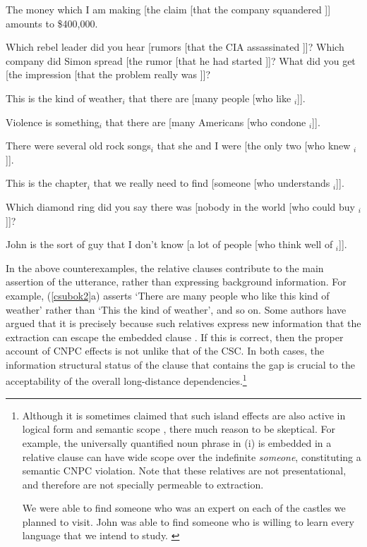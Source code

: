 \documentclass[output=paper
                ,modfonts
                ,nonflat
	        ,collection
	        ,collectionchapter
	        ,collectiontoclongg
 	        ,biblatex
                ,babelshorthands
                ,newtxmath
                ,draftmode
                ,colorlinks, citecolor=brown
]{./langsci/langscibook}
\begin{document}
\eal
 \label{csubok}
\ex The money which I am making [the claim [that the company squandered \spc]] amounts to \$400,000.\\
 \citep[206, 207]{pollardsag}

\ex  Which rebel leader did you hear [rumors [that the CIA assassinated \spc]]?
\ex Which company did Simon spread [the rumor [that he had started \spc]]?
\ex What did you get [the impression [that the problem really was \spc]]?\\
\citep{kluender}
\zl



\eal \label{csubok2}
\ex This is the kind of weather$_i$ that there are [many people [who like \spc$_i$]].\\
\citep{shirlappin}

\ex Violence is something$_i$ that there are [many Americans [who condone \spc$_i$]].\\
\citep[108]{mccawley81}

\ex There were several old rock songs$_i$ that she and I were [the only two [who
knew \spc$_i$]].\\
\citep{chungmc}

\ex This is the chapter$_i$ that we really need to find [someone [who understands \spc$_i$]].\\
\citep[238]{kluender92}

\ex Which diamond ring did you say there was [nobody in the world [who could
buy \spc$_i$]]?\\
\citep[206]{pollardsag}

\ex John is the sort of guy that I don't know [a lot of people [who think well of
\spc$_i$]].\\
\citep[230]{culicover99}
\zl

In the above counterexamples, the relative clauses contribute to the main assertion of the utterance, rather than expressing background information. For example, (\ref{csubok2}a) asserts `There are many people who like this kind of weather' rather than `This the kind of weather', and so on.
Some authors have argued that it is precisely because such relatives
express new information that the extraction can escape the embedded clause
  \citep{shirlappin,kuno87,Dean,goldberg13}.  If this is correct, then the proper 
  account of CNPC effects is not unlike that of the CSC. In both cases, 
  the information structural status of the clause that contains the gap is crucial
  to the acceptability of the overall long-distance dependencies.\footnote{Although it is sometimes claimed
   that
such  island effects are also active in logical form and semantic scope \citep{may85,ruys,fox,sab,katzira}, 
  there much reason to be skeptical.  For example, the universally quantified noun phrase  in (i)  is embedded in a relative clause can have wide scope over the indefinite \emph{someone}, constituting a semantic CNPC violation. Note that these relatives are not presentational, and therefore are not specially permeable to extraction.

\eal
\ex  We were able to find someone who was an expert on each of the
     castles we planned to visit.  \citep[304]{MRS}
\ex John was able to find someone  who is willing to learn every  language
    that we intend to study. \citep{chavesrnr}
\zllast}
\end{document}
